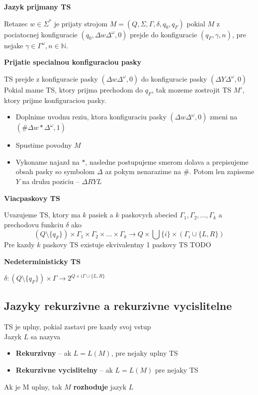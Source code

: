 \documentclass[12pt]{article}
\begin{document}
\textbf{Jazyk prijmany TS}

Retazec $w \in \Sigma^{*}$ je prijaty strojom $M = (Q,\Sigma,\Gamma,\delta,q_{0},q_{F})$ pokial $M$ z pociatocnej konfiguracie
$(q_{0},\Delta w \Delta^{\omega}, 0)$ prejde do konfiguracie $(q_{F}, \gamma, n)$, pre nejake $\gamma \in \Gamma^{\omega}, n \in \mathbb{N}$.

\textbf{Prijatie specialnou konfiguraciou pasky}

TS prejde z konfiguracie pasky $(\Delta w \Delta^{\omega}, 0)$ do konfiguracie pasky $(\Delta Y \Delta^{\omega}, 0)$\\
Pokial mame TS, ktory prijma prechodom do $q_{F}$, tak mozeme zostrojit TS $M'$, ktory prijme konfiguraciou pasky.

\begin{itemize}
	\item Doplnime uvodnu reziu, ktora konfiguraciu pasky $(\Delta w \Delta^{\omega}, 0)$ zmeni na
		$(\#\Delta w * \Delta^{\omega}, 1)$
	\item Spustime povodny $M$
	\item Vykoname najazd na $*$, nasledne postupujeme smerom dolava a prepisujeme obsah pasky so symbolom $\Delta$
		az pokym nenarazime na $\#$. Potom len zapiseme $Y$ na druhu poziciu -- $\Delta RYL$
\end{itemize}

\textbf{Viacpaskovy TS}

Uvazujeme TS, ktory ma $k$ pasiek a $k$ paskovych abecied $\Gamma_{1}, \Gamma_{2}, ..., \Gamma_{k}$
a prechodovu funkciu $\delta$ ako
\begin{equation*}
	(Q \setminus \{q_{F}\}) \times \Gamma_{1} \times \Gamma_{2} \times ... \times \Gamma_{k} \to Q \times \bigcup \{i\} \times (\Gamma_{i} \cup \{L,R\})
\end{equation*}
Pre kazdy $k$ paskovy TS existuje ekvivalentny 1 paskovy TS
TODO

\textbf{Nedeterministicky TS}

$\delta: (Q \setminus \{q_{F}\}) \times \Gamma \to 2^{Q \times (\Gamma \cup \{L,R\}}$

\subsection*{Jazyky rekurzivne a rekurzivne vycislitelne}

TS je uplny, pokial zastavi pre kazdy svoj vstup \\
Jazyk $L$ sa nazyva
\begin{itemize}
	\item \textbf{Rekurzivny} -- ak $L = L(M)$, pre nejaky uplny TS
	\item \textbf{Rekurzivne vycislitelny} -- ak $L = L(M)$ pre nejaky TS
\end{itemize}
Ak je M uplny, tak $M$ \textbf{rozhoduje} jazyk $L$
\end{document}
